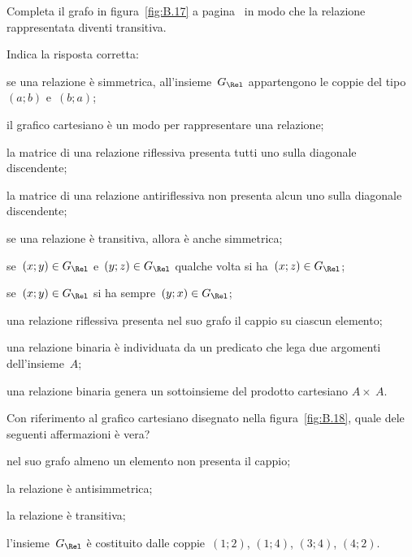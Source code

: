 \begin{multicols}{2}
\begin{esercizio}
\label{ese:B.26}
Completa il grafo in figura~\ref{fig:B.17} a pagina~\pageref{fig:B.17} in modo che la relazione rappresentata diventi transitiva.
\end{esercizio}

\begin{esercizio}
\label{ese:B.27}
Indica la risposta corretta:

\begin{enumeratea}
\TabPositions{12cm}
\item se una relazione è simmetrica, all'insieme~$G_\Rel$ appartengono le coppie del tipo~$(a;b)$ e~$(b;a)$;
\item il grafico cartesiano è un modo per rappresentare una relazione;
\item la matrice di una relazione riflessiva presenta tutti uno sulla diagonale discendente;
\item la matrice di una relazione antiriflessiva non presenta alcun uno sulla diagonale discendente;
\item se una relazione è transitiva, allora è anche simmetrica;
\item se~$(x;y) \in G_\Rel$ e~$(y;z) \in G_\Rel$ qualche volta si ha~$(x;z) \in G_\Rel$;
\item se~$(x;y) \in G_\Rel$ si ha sempre~$(y;x) \in G_\Rel$;
\item una relazione riflessiva presenta nel suo grafo il cappio su ciascun elemento;
\item una relazione binaria è individuata da un predicato che lega due argomenti dell'insieme~$A$;
\item una relazione binaria genera un sottoinsieme del prodotto cartesiano $A \times~A$.
\end{enumeratea}
\end{esercizio}

\begin{esercizio}
\label{ese:B.28}
Con riferimento al grafico cartesiano disegnato nella figura~\ref{fig:B.18}, quale dele seguenti affermazioni è vera?

\begin{enumeratea}
\item nel suo grafo almeno un elemento non presenta il cappio;
\item la relazione è antisimmetrica;
\item la relazione è transitiva;
\item l'insieme~$G_\Rel$ è costituito dalle coppie~$(1;2)$, $(1;4)$, $(3;4)$, $(4;2)$.
\end{enumeratea}
\end{esercizio}
\end{multicols}
